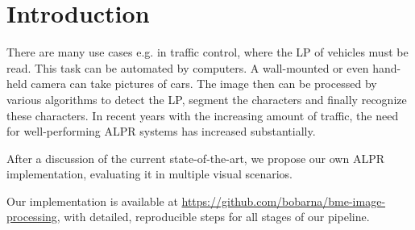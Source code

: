 \section{Introduction}

There are many use cases e.g. in traffic control, where the \ac{LP} of vehicles
must be read.  This task can be automated by computers. A wall-mounted or even
hand-held camera can take pictures of cars. The image then can be processed by
various algorithms to detect the \ac{LP}, segment the characters and finally
recognize these characters.  In recent years with the increasing amount of
traffic, the need for well-performing \ac{ALPR} systems has increased
substantially.

After a discussion of the current state-of-the-art, we propose our own \ac{ALPR}
implementation, evaluating it in multiple visual scenarios.

Our implementation is available at
\url{https://github.com/bobarna/bme-image-processing}, with detailed,
reproducible steps for all stages of our pipeline.
